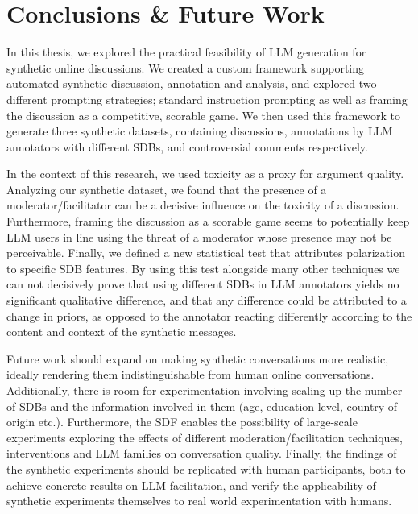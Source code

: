 %
\chapter{Conclusions \& Future Work}
\label{sec:conclusions}

In this thesis, we explored the practical feasibility of LLM generation for synthetic online discussions. We created a custom framework supporting automated synthetic discussion, annotation and analysis, and explored two different prompting strategies; standard instruction prompting as well as framing the discussion as a competitive, scorable game. We then used this framework to generate three synthetic datasets, containing discussions, annotations by LLM annotators with different \acp{SDB}, and controversial comments respectively. 

In the context of this research, we used toxicity as a proxy for argument quality. Analyzing our synthetic dataset, we found that the presence of a moderator/facilitator can be a decisive influence on the toxicity of a discussion. Furthermore, framing the discussion as a scorable game seems to potentially keep LLM users in line using the threat of a moderator whose presence may not be perceivable. Finally, we defined a new statistical test that attributes polarization to specific \ac{SDB} features. By using this test alongside many other techniques we can not decisively prove that using different \acp{SDB} in LLM annotators yields no significant qualitative difference, and that any difference could be attributed to a change in priors, as opposed to the annotator reacting differently according to the content and context of the synthetic messages.

Future work should expand on making synthetic conversations more realistic, ideally rendering them indistinguishable from human online conversations. Additionally, there is room for experimentation involving scaling-up the number of \acp{SDB} and the information involved in them (age, education level, country of origin etc.). Furthermore, the \ac{SDF} enables the possibility of large-scale experiments exploring the effects of different moderation/facilitation techniques, interventions and LLM families on conversation quality. Finally, the findings of the synthetic experiments should be replicated with human participants, both to achieve concrete results on LLM facilitation, and verify the applicability of synthetic experiments themselves to real world experimentation with humans.